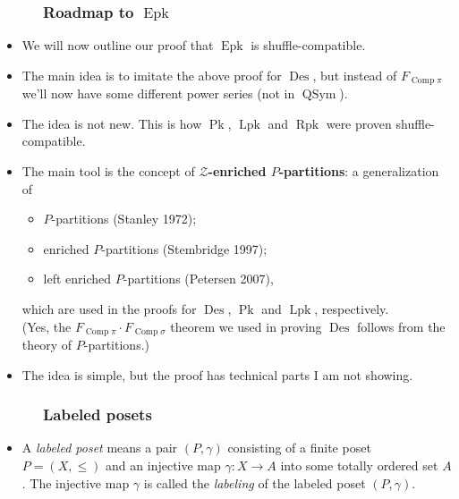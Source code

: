 \documentclass{beamer}
\newcommand{\Comp}{\operatorname{Comp}}
\newcommand{\Lpk}{\operatorname{Lpk}}
\newcommand{\Rpk}{\operatorname{Rpk}}
\newcommand{\Pk}{\operatorname{Pk}}
\newcommand{\Epk}{\operatorname{Epk}}
\newcommand{\Des}{\operatorname{Des}}
\newcommand{\QSym}{\operatorname{QSym}}
\newcommand{\fti}[1]{\frametitle{\ \ \ \ \ #1}}
\newcommand{\defn}[1]{{\color{darkred}\emph{#1}}} %
\theoremstyle{plain}
\begin{document}
\begin{frame}
\fti{Roadmap to $\Epk$}

\begin{itemize}

\item We will now outline our proof that $\Epk$ is shuffle-compatible.

\item The main idea is to imitate the above proof for $\Des$,
      but instead of $F_{\Comp \pi}$ we'll now have
      some different power series (not in $\QSym$).

\pause

\item The idea is not new.
      This is how $\Pk$, $\Lpk$ and $\Rpk$ were proven
      shuffle-compatible.

\pause

\item The main tool is the concept of
      \textbf{$\mathcal{Z}$-enriched $P$-partitions}:
      a generalization of
      \begin{itemize}
      \item $P$-partitions (Stanley 1972);
      \item enriched $P$-partitions (Stembridge 1997);
      \item left enriched $P$-partitions (Petersen 2007),
      \end{itemize}
      which are used in the proofs for $\Des$, $\Pk$
      and $\Lpk$, respectively. \pause
      \\ (Yes, the $F_{\Comp \pi} \cdot F_{\Comp \sigma}$
      theorem we used in proving $\Des$ follows from the
      theory of $P$-partitions.)

\pause

\item The idea is simple, but the proof has technical
      parts I am not showing.

\end{itemize}

\end{frame}

\begin{frame}
\fti{Labeled posets}

\begin{itemize}

\item A \defn{labeled poset} means a pair $\left(  P,\gamma\right)  $ consisting
of a finite poset $P=\left(  X,\leq\right)  $ and an injective map
$\gamma:X\rightarrow A$ into some totally ordered set $A$. The injective map
$\gamma$ is called the \defn {labeling} of the labeled poset $\left(
P,\gamma\right)  $.

\end{itemize}

\end{frame}
\end{document}
